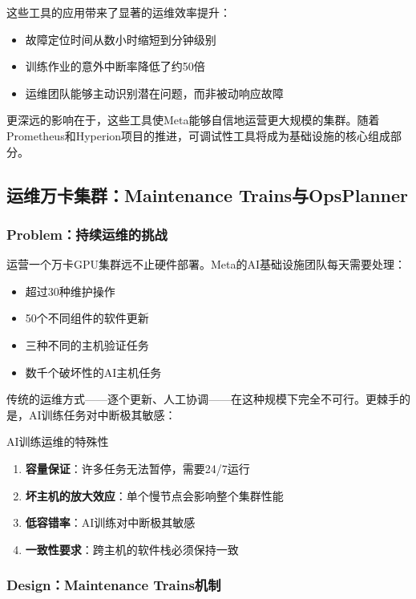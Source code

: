 这些工具的应用带来了显著的运维效率提升：

\begin{itemize}
    \item 故障定位时间从数小时缩短到分钟级别
    \item 训练作业的意外中断率降低了约50倍
    \item 运维团队能够主动识别潜在问题，而非被动响应故障
\end{itemize}

更深远的影响在于，这些工具使Meta能够自信地运营更大规模的集群。随着Prometheus和Hyperion项目的推进，可调试性工具将成为基础设施的核心组成部分。

\subsection{运维万卡集群：Maintenance Trains与OpsPlanner}

\subsubsection{Problem：持续运维的挑战}

运营一个万卡GPU集群远不止硬件部署。Meta的AI基础设施团队每天需要处理：

\begin{itemize}
    \item 超过30种维护操作
    \item 50个不同组件的软件更新
    \item 三种不同的主机验证任务
    \item 数千个破坏性的AI主机任务
\end{itemize}

传统的运维方式——逐个更新、人工协调——在这种规模下完全不可行。更棘手的是，AI训练任务对中断极其敏感：

\begin{insightbox}{AI训练运维的特殊性}
\begin{enumerate}
    \item \textbf{容量保证}：许多任务无法暂停，需要24/7运行
    \item \textbf{坏主机的放大效应}：单个慢节点会影响整个集群性能
    \item \textbf{低容错率}：AI训练对中断极其敏感
    \item \textbf{一致性要求}：跨主机的软件栈必须保持一致
\end{enumerate}
\end{insightbox}

\subsubsection{Design：Maintenance Trains机制}

